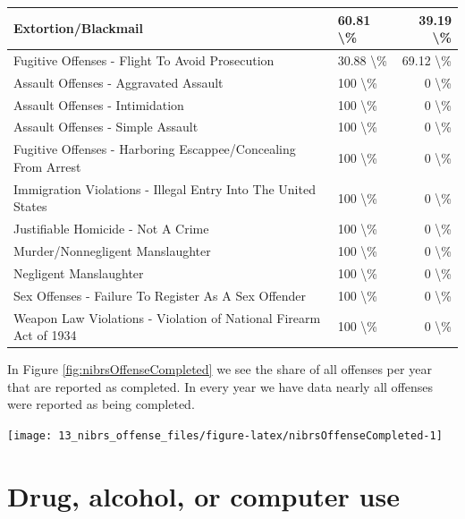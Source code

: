 \documentclass[
]{krantz}
\let\origfigure\figure
\let\endorigfigure\endfigure
\renewenvironment{figure}[1][2] {
    \expandafter\origfigure\expandafter[H]
} {
    \endorigfigure
}
\begin{document}
\begin{longtable}[t]{l|l|r}
\hline
Extortion/Blackmail & 60.81 \textbackslash{}\% & 39.19 \textbackslash{}\%\\
\hline
Fugitive Offenses - Flight To Avoid Prosecution & 30.88 \textbackslash{}\% & 69.12 \textbackslash{}\%\\
\hline
Assault Offenses - Aggravated Assault & 100 \textbackslash{}\% & 0 \textbackslash{}\%\\
\hline
Assault Offenses - Intimidation & 100 \textbackslash{}\% & 0 \textbackslash{}\%\\
\hline
Assault Offenses - Simple Assault & 100 \textbackslash{}\% & 0 \textbackslash{}\%\\
\hline
Fugitive Offenses - Harboring Escappee/Concealing From Arrest & 100 \textbackslash{}\% & 0 \textbackslash{}\%\\
\hline
Immigration Violations - Illegal Entry Into The United States & 100 \textbackslash{}\% & 0 \textbackslash{}\%\\
\hline
Justifiable Homicide - Not A Crime & 100 \textbackslash{}\% & 0 \textbackslash{}\%\\
\hline
Murder/Nonnegligent Manslaughter & 100 \textbackslash{}\% & 0 \textbackslash{}\%\\
\hline
Negligent Manslaughter & 100 \textbackslash{}\% & 0 \textbackslash{}\%\\
\hline
Sex Offenses - Failure To Register As A Sex Offender & 100 \textbackslash{}\% & 0 \textbackslash{}\%\\
\hline
Weapon Law Violations - Violation of National Firearm Act of 1934 & 100 \textbackslash{}\% & 0 \textbackslash{}\%\\
\hline
\end{longtable}

In Figure \ref{fig:nibrsOffenseCompleted} we see the share
of all offenses per year that are reported as completed. In
every year we have data nearly all offenses were reported as
being completed.

\begin{figure}

{\centering \texttt{[image: 13\_nibrs\_offense\_files/figure-latex/nibrsOffenseCompleted-1]} 

}

\caption{The annual percent of offenses reported as completed, 1991-2022.}\label{fig:nibrsOffenseCompleted}
\end{figure}

\section{Drug, alcohol, or computer
use}\label{drug-alcohol-or-computer-use}
\end{document}
